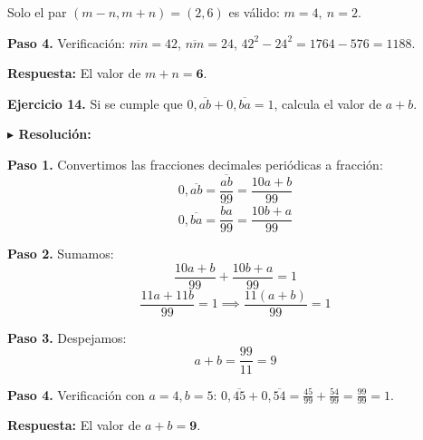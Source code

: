 \documentclass[10pt]{article}
\newcommand{\ejercicio}[2]{%
  \begin{enuncbox}
    \textbf{\textcolor{enunciado}{Ejercicio #1.}} #2
  \end{enuncbox}
}
\newcommand{\resolucion}{\vspace{2pt}\textbf{\textcolor{resolucion}{$\blacktriangleright$ Resolución:}}\vspace{4pt}}
\newcommand{\respuesta}[1]{%
  \begin{respbox}
    \textbf{\textcolor{respuesta}{Respuesta:}} #1
  \end{respbox}
}
\begin{document}
Solo el par $(m-n, m+n) = (2, 6)$ es válido: $m = 4,\ n = 2$.

\textbf{Paso 4.} Verificación: $\overline{mn} = 42$, $\overline{nm} = 24$, $42^2 - 24^2 = 1764 - 576 = 1188$. \checkmark

\respuesta{El valor de $m + n = \mathbf{6}$.}

\ejercicio{14}{Si se cumple que $0{,}\overline{ab} + 0{,}\overline{ba} = 1$, calcula el valor de $a + b$.}

\resolucion

\textbf{Paso 1.} Convertimos las fracciones decimales periódicas a fracción:
\[
    0{,}\overline{ab} = \frac{\overline{ab}}{99} = \frac{10a+b}{99}
\]
\[
    0{,}\overline{ba} = \frac{\overline{ba}}{99} = \frac{10b+a}{99}
\]

\textbf{Paso 2.} Sumamos:
\[
    \frac{10a+b}{99} + \frac{10b+a}{99} = 1
\]
\[
    \frac{11a + 11b}{99} = 1 \implies \frac{11(a+b)}{99} = 1
\]

\textbf{Paso 3.} Despejamos:
\[
    a + b = \frac{99}{11} = 9
\]

\textbf{Paso 4.} Verificación con $a=4, b=5$: $0{,}\overline{45} + 0{,}\overline{54} = \tfrac{45}{99} + \tfrac{54}{99} = \tfrac{99}{99} = 1$. \checkmark

\respuesta{El valor de $a + b = \mathbf{9}$.}
\end{document}
